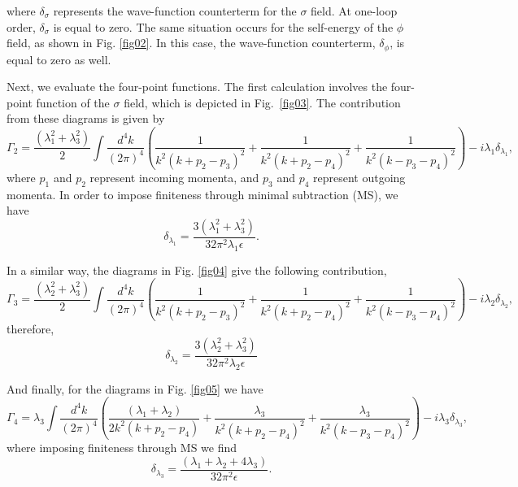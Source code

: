 \documentclass[11pt,a4paper,english,superscriptaddress,preprint,aps,prd]{revtex4}
\begin{document}
\noindent where $\delta_\sigma$ represents the wave-function counterterm for the $\sigma$ field. At one-loop order, $\delta_\sigma$ is equal to zero. The same situation occurs for the self-energy of the $\phi$ field, as shown in Fig. \ref{fig02}. In this case, the wave-function counterterm, $\delta_\phi$, is equal to zero as well.

Next, we evaluate the four-point functions. The first calculation involves the four-point function of the $\sigma$ field, which is depicted in Fig.~\ref{fig03}. The contribution from these diagrams is given by
\begin{equation}
\Gamma_2 = \frac{(\lambda_1^2 + \lambda_3^2)}{2}\int\frac{d^4k}{(2\pi)^4}\left(\frac{1}{k^2(k+p_2-p_3)^2} + \frac{1}{k^2(k+p_2-p_4)^2} + \frac{1}{k^2(k-p_3-p_4)^2}\right) - i\lambda_1\delta_{\lambda_1},
\end{equation}
where $p_1$ and $p_2$ represent incoming momenta, and $p_3$ and $p_4$ represent outgoing momenta. In order to impose finiteness through minimal subtraction (MS), we have
\begin{equation}
\delta_{\lambda_1} = \frac{3(\lambda_1^2 + \lambda_3^2)}{32\pi^2\lambda_1\epsilon}.
\end{equation}

In a similar way, the diagrams in Fig. \ref{fig04} give the following contribution,
\begin{equation}
 \Gamma_3 = \frac{(\lambda_2^2 + \lambda_3^2)}{2}\int\frac{d^4k}{(2\pi)^4}\left(\frac{1}{k^2(k+p_2-p_3)^2} + \frac{1}{k^2(k+p_2-p_4)^2} + \frac{1}{k^2(k-p_3-p_4)^2}\right) - i\lambda_2\delta_{\lambda_2},
\end{equation}
therefore,
\begin{equation}
 \delta_{\lambda_2} = \frac{3(\lambda_2^2 + \lambda_3^2)}{32\pi^2\lambda_2\epsilon}
\end{equation}

And finally, for the diagrams in Fig. \ref{fig05} we have
\begin{equation}
 \Gamma_4 = \lambda_3\int\frac{d^4k}{(2\pi)^4}\left(\frac{(\lambda_1+\lambda_2)}{2k^2(k+p_2-p_4)} + \frac{\lambda_3}{k^2(k+p_2-p_4)^2} + \frac{\lambda_3}{k^2(k-p_3-p_4)^2}\right) - i\lambda_3\delta_{\lambda_3},
\end{equation}
\noindent where imposing finiteness through MS we find
\begin{equation}
 \delta_{\lambda_3} = \frac{(\lambda_1+\lambda_2+4\lambda_3)}{32\pi^2\epsilon}.
\end{equation}
\end{document}
